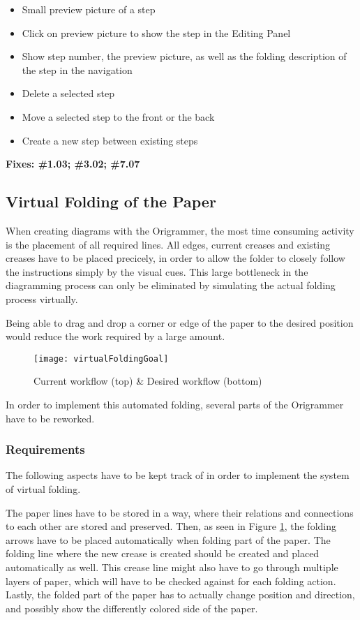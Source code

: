 \begin{itemize}
\item Small preview picture of a step
\item Click on preview picture to show the step in the Editing Panel
\item Show step number, the preview picture, as well as the folding description of the step in the navigation
\item Delete a selected step
\item Move a selected step to the front or the back
\item Create a new step between existing steps
\end{itemize}

\textbf{Fixes: \#1.03; \#3.02;   \#7.07}


\subsection{Virtual Folding of the Paper}
\label{sec:virtualFolding}

When creating diagrams with the Origrammer, the most time consuming activity is the placement of all required lines. All edges, current creases and existing creases have to be placed precicely, in order to allow the folder to closely follow the instructions simply by the visual cues. This large bottleneck in the diagramming process can only be eliminated by simulating the actual folding process virtually.

Being able to drag and drop a corner or edge of the paper to the desired position would reduce the work required by a large amount.

 \begin{figure}[htbp]
	\centering
	\texttt{[image: virtualFoldingGoal]}
	\caption{Current workflow (top) \& Desired workflow (bottom)}
	\label{fig:virtualFoldingGoal}
\end{figure}

In order to implement this automated folding, several parts of the Origrammer have to be reworked.\\

\subsubsection*{Requirements}

The following aspects have to be kept track of in order to implement the system of virtual folding.

The paper lines have to be stored in a way, where their relations and connections to each other are stored and preserved. Then, as seen in Figure \ref{fig:virtualFoldingGoal}, the folding arrows have to be placed automatically when folding part of the paper. The folding line where the new crease is created should be created and placed automatically as well. This crease line might also have to go through multiple layers of paper, which will have to be checked against for each folding action. Lastly, the folded part of the paper has to actually change position and direction, and possibly show the differently colored side of the paper.\\

